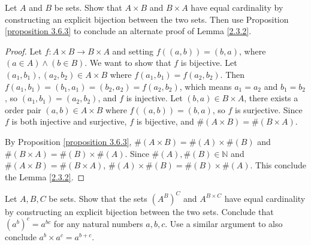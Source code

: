 \begin{exercise}\label{exercise 3.6.3}
Let \(A\) and \(B\) be sets.
Show that \(A \times B\) and \(B \times A\) have equal cardinality by constructing an explicit bijection between the two sets.
Then use Proposition \ref{proposition 3.6.3} to conclude an alternate proof of Lemma \ref{2.3.2}.
\end{exercise}

\begin{proof}
Let \(f : A \times B \to B \times A\) and setting \(f((a, b)) = (b, a)\), where \((a \in A) \land (b \in B)\).
We want to show that \(f\) is bijective.
Let \((a_1, b_1), (a_2, b_2) \in A \times B\) where \(f(a_1, b_1) = f(a_2, b_2)\).
Then \(f(a_1, b_1) = (b_1, a_1) = (b_2, a_2) = f(a_2, b_2)\), which means \(a_1 = a_2\) and \(b_1 = b_2\), so \((a_1, b_1) = (a_2, b_2)\), and \(f\) is injective.
Let \((b, a) \in B \times A\), there exists a order pair \((a, b) \in A \times B\) where \(f((a, b)) = (b, a)\), so \(f\) is surjective.
Since \(f\) is both injective and surjective, \(f\) is bijective, and \(\#(A \times B) = \#(B \times A)\).

By Proposition \ref{proposition 3.6.3}, \(\#(A \times B) = \#(A) \times \#(B)\) and \(\#(B \times A) = \#(B) \times \#(A)\).
Since \(\#(A), \#(B) \in \mathds{N}\) and \(\#(A \times B) = \#(B \times A)\), \(\#(A) \times \#(B) = \#(B) \times \#(A)\).
This conclude the Lemma \ref{2.3.2}.
\end{proof}

\begin{exercise}\label{exercise 3.6.4}
Let \(A, B, C\) be sets.
Show that the sets \((A^B)^C\) and \(A^{B \times C}\) have equal cardinality by constructing an explicit bijection between the two sets.
Conclude that \((a^b)^c = a^{bc}\) for any natural numbers \(a, b, c\).
Use a similar argument to also conclude \(a^b \times a^c = a^{b+c}\).
\end{exercise}


